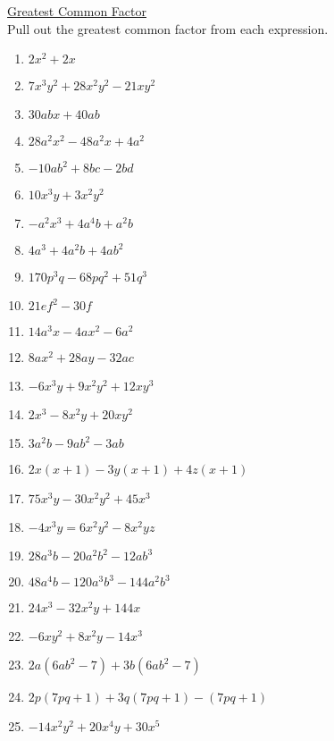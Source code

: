 \documentclass{article}
\begin{document}
\newpage
\underline{Greatest Common Factor} \\
Pull out the greatest common factor from each expression. \\
\begin{enumerate}
\item $2x^{2} + 2x$
\item $7x^{3}y^{2} + 28x^{2}y^{2} - 21xy^{2}$
\item $30abx + 40ab$
\item $28a^{2}x^{2} - 48a^{2}x + 4a^{2}$
\item $-10ab^{2} + 8bc - 2bd$
\item $10x^{3}y + 3x^{2}y^{2}$
\item $-a^{2}x^{3} + 4a^{4}b + a^{2}b$
\item $4a^{3} + 4a^{2}b + 4ab^{2}$
\item $170p^{3}q - 68pq^{2} + 51q^{3}$
\item $21ef^{2} - 30f$
\item $14a^{3}x - 4ax^{2} - 6a^{2}$
\item $8ax^{2} + 28ay - 32ac$
\item $-6x^{3}y + 9x^{2}y^{2} + 12xy^{3}$
\item $2x^{3} - 8x^{2}y + 20xy^{2}$
\item $3a^{2}b - 9ab^{2} - 3ab$
\item $2x(x+1) - 3y(x+1) + 4z(x+1)$
\item $75x^{3}y - 30x^{2}y^{2} + 45x^{3}$
\item $-4x^{3}y = 6x^{2}y^{2} - 8x^{2}yz$
\item $28a^{3}b - 20a^{2}b^{2} - 12ab^{3}$
\item $48a^{4}b - 120a^{3}b^{3} - 144a^{2}b^{3}$
\item $24x^{3} - 32x^{2}y + 144x$
\item $-6xy^{2} + 8x^{2}y - 14x^{3}$
\item $2a(6ab^{2}-7) + 3b(6ab^{2}-7)$
\item $2p(7pq+1) + 3q(7pq+1) - (7pq+1)$
\item $-14x^{2}y^{2} + 20x^{4}y + 30x^{5}$
\end{enumerate}
\end{document}
